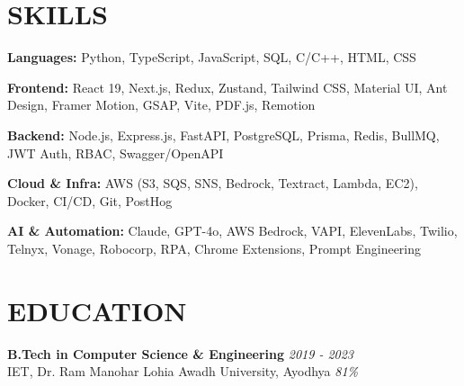 \documentclass[a4paper,10pt]{article}
\begin{document}
\vspace{3pt}

\section{SKILLS}

\textbf{Languages:} Python, TypeScript, JavaScript, SQL, C/C++, HTML, CSS

\textbf{Frontend:} React 19, Next.js, Redux, Zustand, Tailwind CSS, Material UI, Ant Design, Framer Motion, GSAP, Vite, PDF.js, Remotion

\textbf{Backend:} Node.js, Express.js, FastAPI, PostgreSQL, Prisma, Redis, BullMQ, JWT Auth, RBAC, Swagger/OpenAPI

\textbf{Cloud \& Infra:} AWS (S3, SQS, SNS, Bedrock, Textract, Lambda, EC2), Docker, CI/CD, Git, PostHog

\textbf{AI \& Automation:} Claude, GPT-4o, AWS Bedrock, VAPI, ElevenLabs, Twilio, Telnyx, Vonage, Robocorp, RPA, Chrome Extensions, Prompt Engineering

\vspace{3pt}

\section{EDUCATION}

\textbf{B.Tech in Computer Science \& Engineering} \hfill \textit{2019 - 2023}\\
IET, Dr. Ram Manohar Lohia Awadh University, Ayodhya \hfill \textit{81\%}
\end{document}
